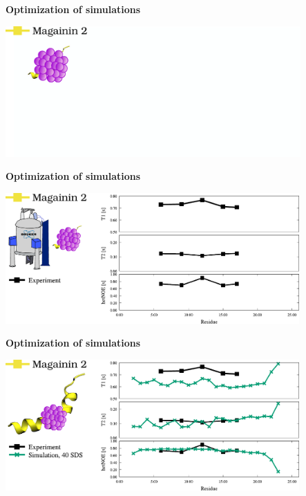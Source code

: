 \documentclass{beamer}
\begin{document}
\begin{frame}
\begin{center}
\Large{\centering

\textbf{Optimization of simulations} \\}

\vspace{0.5cm}


\includegraphics[height=5cm]{mag5.pdf}
\end{center}
\end{frame}

\addtocounter{framenumber}{-1}
\begin{frame}
\begin{center}
\Large{\centering

\textbf{Optimization of simulations} \\}

\vspace{0.5cm}


\includegraphics[height=5cm]{mag4.pdf}
\end{center}
\end{frame}


\addtocounter{framenumber}{-1}
\begin{frame}
\begin{center}
\Large{\centering

\textbf{Optimization of simulations} \\}

\vspace{0.5cm}


\includegraphics[height=5cm]{mag3.pdf}
\end{center}
\end{frame}
\end{document}
